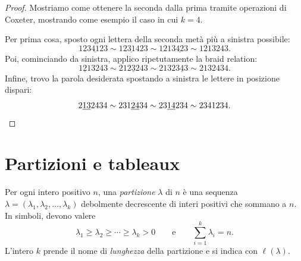 \begin{proof}
    Mostriamo come ottenere la seconda dalla prima tramite operazioni di Coxeter,
    mostrando come esempio il caso in cui $k = 4$.

    Per prima cosa, sposto ogni lettera della seconda met\`a pi\`u a sinistra possibile:
    \[
        123\underline{41}23
        \sim
        12\underline{31}423
        \sim
        1213\underline{42}3
        \sim
        1213243.
    \]
    Poi, cominciando da sinistra, applico ripetutamente la braid relation:
    \[
        \underline{121}3243
        \sim
        21\underline{232}43
        \sim
        2132\underline{343}
        \sim
        2132434.
    \]
    Infine, trovo la parola desiderata spostando a sinistra le lettere in
    posizione dispari:
    \[
        2\underline{13}2434
        \sim
        231\underline{24}34
        \sim
        23\underline{14}234
        \sim
        2341234.
        \qedhere
    \]
\end{proof}


\section{Partizioni e tableaux}


\begin{definition}[Partizione]
    Per ogni intero positivo $n$, una \emph{partizione} $\lambda$ di $n$ 
    \`e una sequenza $\lambda = (\lambda_1, \lambda_2, \dots, \lambda_k)$
    debolmente decrescente di interi positivi che sommano a $n$.
    In simboli, devono valere
    \[
        \lambda_1 \geq \lambda_2 \geq \cdots \geq \lambda_k > 0
        \qquad \text{e} \qquad
        \sum_{i=1}^k \lambda_i = n.
    \]
    L'intero $k$ prende il nome di \emph{lunghezza} della partizione e si indica
    con $\ell(\lambda)$.
\end{definition}

